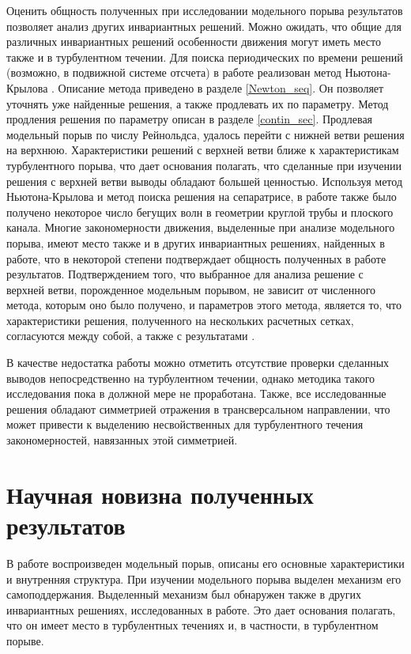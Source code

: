 Оценить общность полученных при исследовании модельного порыва результатов позволяет анализ других инвариантных решений. Можно ожидать, что общие для различных инвариантных решений особенности движения могут иметь место также и в турбулентном течении. Для поиска периодических по времени решений (возможно, в подвижной системе отсчета) в работе реализован метод Ньютона-Крылова \cite{Viswanath2007, Dijkstra2014}. Описание метода приведено в разделе \ref{Newton_seq}. Он позволяет уточнять уже найденные решения, а также продлевать их по параметру. Метод продления решения по параметру описан в разделе \ref{contin_sec}. Продлевая модельный порыв по числу Рейнольдса, удалось перейти с нижней ветви решения на верхнюю. Характеристики решений с верхней ветви ближе к характеристикам турбулентного порыва, что дает основания полагать, что сделанные при изучении решения с верхней ветви выводы обладают большей ценностью. Используя метод Ньютона-Крылова и метод поиска решения на сепаратрисе, в работе также было получено некоторое число бегущих волн в геометрии круглой трубы и плоского канала. Многие закономерности движения, выделенные при анализе модельного порыва, имеют место также и в других инвариантных решениях, найденных в работе, что в некоторой степени подтверждает общность полученных в работе результатов. Подтверждением того, что выбранное для анализа решение с верхней ветви, порожденное модельным порывом, не зависит от численного метода, которым оно было получено, и параметров этого метода, является то, что характеристики решения, полученного на нескольких расчетных сетках, согласуются между собой, а также с результатами \cite{Avila2013}. 

В качестве недостатка работы можно отметить отсутствие проверки сделанных выводов непосредственно на турбулентном течении, однако методика такого исследования пока в должной мере не проработана. Также, все исследованные решения обладают симметрией отражения в трансверсальном направлении, что может привести к выделению несвойственных для турбулентного течения закономерностей, навязанных этой симметрией. 


\section{Научная новизна полученных результатов}

В работе воспроизведен модельный порыв, описаны его основные характеристики и внутренняя структура. При изучении модельного порыва выделен механизм его самоподдержания. Выделенный механизм был обнаружен также в других инвариантных решениях, исследованных в работе. Это дает основания полагать, что он имеет место в турбулентных течениях и, в частности, в турбулентном порыве.

